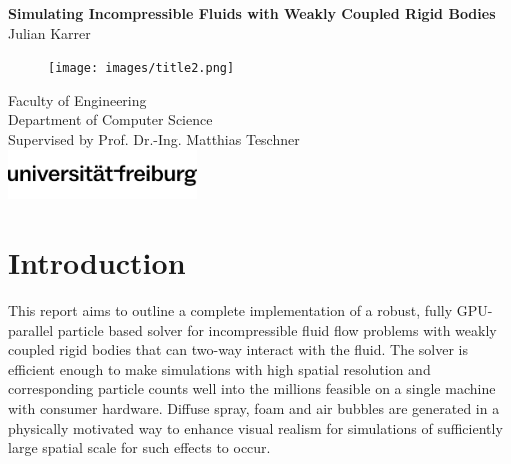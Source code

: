 \documentclass[oneside, a4paper]{book}
\begin{document}
\begin{titlepage}
  \pagestyle{empty}

  \begin{center}
    \Huge\textbf{Simulating Incompressible Fluids with Weakly Coupled Rigid Bodies}\\
    \vspace{0.5cm}
    \Large{Julian Karrer}\\
    \vfill
    \Large
    \begin{figure}[H]
        \centering
        \texttt{[image: images/title2.png]}
    \end{figure}
    \vfill
    \large
    Faculty of Engineering\\
    Department of Computer Science\\
    Supervised by Prof. Dr.-Ing. Matthias Teschner\\
    \vspace{0.5cm}
    \includegraphics*[width=5cm]{images/ufr-logo.png}
  \end{center}
\end{titlepage}

\tableofcontents
\newpage

\chapter{Introduction}
This report aims to outline a complete implementation of a robust, fully GPU-parallel particle based solver for incompressible fluid flow problems with weakly coupled rigid bodies that can two-way interact with the fluid. The solver is efficient enough to make simulations with high spatial resolution and corresponding particle counts well into the millions feasible on a single machine with consumer hardware. Diffuse spray, foam and air bubbles are generated in a physically motivated way to enhance visual realism for simulations of sufficiently large spatial scale for such effects to occur. \\
\end{document}

